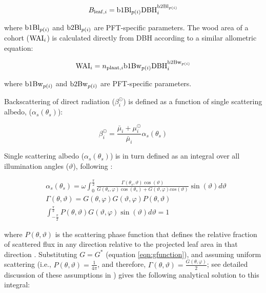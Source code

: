 \begin{equation}
  B_{\mathrm{leaf}, i} = \mathrm{b1Bl}_{p(i)} \mathrm{DBH}_{i}^{\mathrm{b2Bl}_{p(i)}}
\end{equation}

where $\mathrm{b1Bl}_{p(i)}$ and $\mathrm{b2Bl}_{p(i)}$ are PFT-specific parameters.
The wood area of a cohort ($\mathrm{WAI}_{i}$) is calculated directly from DBH according to a similar allometric equation:

\begin{equation}
  \mathrm{WAI}_{i} = n_{\mathrm{plant}, i} \mathrm{b1Bw}_{p(i)} \mathrm{DBH}_{i}^{\mathrm{b2Bw}_{p(i)}}
\end{equation}

where $\mathrm{b1Bw}_{p(i)}$ and $\mathrm{b2Bw}_{p(i)}$ are PFT-specific parameters.

Backscattering of direct radiation ($\beta^{\odot}_{i}$) is defined as a function of single scattering albedo, ($\alpha_{s}(\theta_{s})$):

\begin{equation}\label{eqn:backscatter-direct}
  \beta^{\odot}_{i} = \frac{\bar{\mu}_{i} + \mu^{\odot}_{i}}{\bar{\mu}_{i}} \alpha_{s}(\theta_{s})
\end{equation}

Single scattering albedo ($\alpha_{s}(\theta_{s})$) is in turn defined as an integral over all illumination angles ($\vartheta$), following \citet{sellers1985canopy} :

\begin{align}\label{eqn:ssa-integral}
  & \alpha_{s}(\theta_{s}) = \omega \int_{0}^{\frac{\pi}{2}} \frac{\Gamma(\theta_{s}, \vartheta) \cos(\vartheta)} {G(\theta_{s}, \varphi) \cos(\theta_{s}) + G(\vartheta, \varphi) cos(\vartheta)} \sin(\vartheta) d \vartheta \\
  & \Gamma(\theta, \vartheta) = G(\theta, \varphi) G(\vartheta, \varphi) P(\theta, \vartheta) \\
  & \int_{-\frac{\pi}{2}}^{\frac{\pi}{2}} P(\theta, \vartheta) G(\vartheta, \varphi) \sin(\vartheta) d\vartheta = 1
\end{align}

where $P(\theta, \vartheta)$ is the scattering phase function that defines the relative fraction of scattered flux in any direction relative to the projected leaf area in that direction \citep{dickinson1983land}.
Substituting $G = G^{*}$ (equation \ref{eqn:gfunction}),
and assuming uniform scattering (i.e., $P(\theta, \vartheta) = \frac{1}{4\pi}$, and therefore, $\Gamma(\theta, \vartheta) = \frac{G(\theta, \varphi)}{2}$; see detailed discussion of these assumptions in \citealt{yuan2017reexamination})
gives the following analytical solution to this integral:

